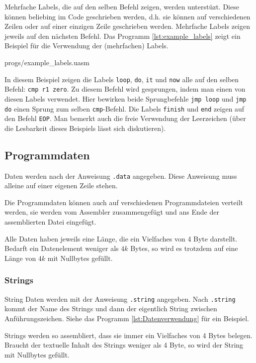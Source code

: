 Mehrfache Labels, die auf den selben Befehl zeigen, werden unterstüzt. Diese
können beliebing im Code geschrieben werden, d.h. sie können auf verschiedenen
Zeilen oder auf einer einzigen Zeile geschrieben werden. Mehrfache Labels
zeigen jeweils auf den nächsten Befehl. Das Programm \ref{lst:example_labels}
zeigt ein Beispiel für die Verwendung der (mehrfachen) Labels.


{progs/example_labels.uasm}

In diesem Beispiel zeigen die Labels \texttt{loop}, \texttt{do}, \texttt{it} und
\texttt{now} alle auf den selben Befehl: \texttt{cmp r1 zero}. Zu diesem Befehl
wird gesprungen, indem man einen von diesen Labels verwendet. Hier bewirken
beide Sprungbefehle \texttt{jmp loop} und \texttt{jmp do} einen Sprung zum
selben \texttt{cmp}-Befehl. Die Labels \texttt{finish} und \texttt{end} zeigen
auf den Befehl \texttt{EOP}. Man bemerkt auch die freie Verwendung der
Leerzeichen (über die Lesbarkeit dieses Beispiels lässt sich diskutieren).


\subsection{Programmdaten}

Daten werden nach der Anweisung \texttt{.data} angegeben. Diese Anweisung muss
alleine auf einer eigenen Zeile stehen.

Die Programmdaten können auch auf
verschiedenen Programmdateien verteilt werden, sie werden vom Assembler
zusammengefügt und ans Ende der assemblierten Datei eingefügt.

Alle Daten haben jeweils eine Länge, die ein Vielfaches von 4 Byte darstellt.
Bedarft ein Datenelement weniger als $4k$ Bytes, so wird es trotzdem auf
eine Länge von $4 k$ mit Nullbytes gefüllt.

\subsubsection{Strings}

String Daten werden mit der Anweisung \texttt{.string} angegeben. Nach
\texttt{.string} kommt der Name des Strings und dann der eigentlich String
zwischen Anführungszeichen. Siehe das Programm \ref{lst:Datenverwendung} für ein
Beispiel.

Strings werden so assembliert, dass sie immer ein Vielfaches von 4 Bytes
belegen. Braucht der textuelle Inhalt des Strings weniger als 4 Byte, so wird
der String mit Nullbytes gefüllt.


